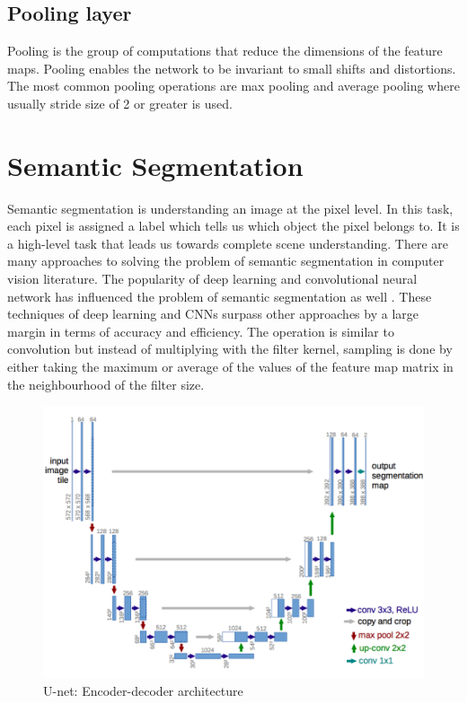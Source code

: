 \documentclass[a4paper, 12pt, oneside, BCOR1cm,toc=chapterentrywithdots]{scrbook}
\begin{document}
\subsection{Pooling layer}

Pooling is the group of computations that reduce the dimensions of the feature maps. Pooling enables the network to be invariant to small shifts and distortions. The most common pooling operations are max pooling and average pooling where usually stride size of 2 or greater is used. 






\section{Semantic Segmentation}

Semantic segmentation is understanding an image at the pixel level. In this task, each pixel is assigned a label which tells us which object the pixel belongs to. It is a high-level task that leads us towards complete scene understanding. There are many approaches to solving the problem of semantic segmentation in computer vision literature. The popularity of deep learning and convolutional neural network has influenced the problem of semantic segmentation as well \cite{zhu2016beyond}. These techniques of deep learning and CNNs surpass other approaches by a large margin in terms of accuracy and efficiency\cite{zhao2017survey}. The operation is similar to convolution but instead of multiplying with the filter kernel, sampling is done by either taking the maximum or average of the values of the feature map matrix in the neighbourhood of the filter size. 


\begin{figure}[h]
\centering
\includegraphics[width=1\textwidth]{unet.png}
\caption{U-net: Encoder-decoder architecture \cite{ronneberger2015u}}
\label{unet}
\end{figure}
\end{document}
